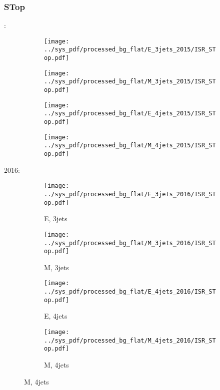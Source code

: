 \documentclass{beamer}
\begin{document}
\begin{frame}
\frametitle{STop}
\fontsize{5}{1}:
\begin{figure}
\centering
\begin{subfigure}[b]{0.24\textwidth}
\texttt{[image: ../sys\_pdf/processed\_bg\_flat/E\_3jets\_2015/ISR\_STop.pdf]}
\end{subfigure}
\begin{subfigure}[b]{0.24\textwidth}
\texttt{[image: ../sys\_pdf/processed\_bg\_flat/M\_3jets\_2015/ISR\_STop.pdf]}
\end{subfigure}
\begin{subfigure}[b]{0.24\textwidth}
\texttt{[image: ../sys\_pdf/processed\_bg\_flat/E\_4jets\_2015/ISR\_STop.pdf]}
\end{subfigure}
\begin{subfigure}[b]{0.24\textwidth}
\texttt{[image: ../sys\_pdf/processed\_bg\_flat/M\_4jets\_2015/ISR\_STop.pdf]}
\end{subfigure}
\end{figure}
2016:
\begin{figure}
\centering
\begin{subfigure}[b]{0.24\textwidth}
\texttt{[image: ../sys\_pdf/processed\_bg\_flat/E\_3jets\_2016/ISR\_STop.pdf]}
\captionsetup{font=tiny}
\caption{E, 3jets}
\end{subfigure}
\begin{subfigure}[b]{0.24\textwidth}
\texttt{[image: ../sys\_pdf/processed\_bg\_flat/M\_3jets\_2016/ISR\_STop.pdf]}
\captionsetup{font=tiny}
\caption{M, 3jets}
\end{subfigure}
\begin{subfigure}[b]{0.24\textwidth}
\texttt{[image: ../sys\_pdf/processed\_bg\_flat/E\_4jets\_2016/ISR\_STop.pdf]}
\captionsetup{font=tiny}
\caption{E, 4jets}
\end{subfigure}
\begin{subfigure}[b]{0.24\textwidth}
\texttt{[image: ../sys\_pdf/processed\_bg\_flat/M\_4jets\_2016/ISR\_STop.pdf]}
\captionsetup{font=tiny}
\caption{M, 4jets}
\end{subfigure}
\end{figure}
\end{frame}
\end{document}
